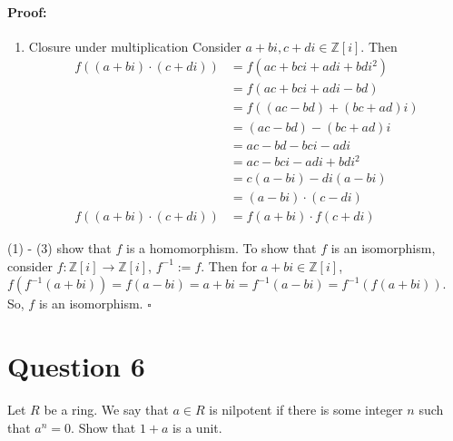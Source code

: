 \documentclass [12pt] {article}
\newcommand{\Z}{\mathbb{Z}}
\newenvironment{proof}{\paragraph{Proof:}}{\hfill$\square$}
\begin{document}
\begin{proof}
\begin{enumerate}
        \item Closure under multiplication Consider $a + bi, c + di \in \Z[i]$. Then
            \begin{align*}
                f((a + bi) \cdot (c + di)) &= f(ac + bci + adi + bdi^2) \\
                                       &= f(ac + bci + adi - bd) \\
                                       &= f((ac - bd) + (bc + ad)i) \\
                                       &= (ac - bd) - (bc + ad)i \\
                                       &= ac - bd - bci - adi \\
                                       &= ac - bci - adi + bdi^2 \\
                                       &= c(a - bi) - di(a - bi) \\
                                       &= (a - bi) \cdot (c - di) \\
                f((a + bi) \cdot (c + di)) &= f(a + bi) \cdot f(c + di)
            \end{align*}
    \end{enumerate}
    (1) - (3) show that $f$ is a homomorphism. To show that $f$ is an isomorphism, consider
    $f : \Z[i] \to \Z[i]$, $f^{-1} := f$. Then for $a + bi \in \Z[i]$, 
    $f(f^{-1}(a + bi)) = f(a - bi) = a + bi = f^{-1}(a - bi) = f^{-1}(f(a + bi))$. So, $f$ is an
    isomorphism.
\end{proof}
\newpage

\section*{Question 6}
Let $R$ be a ring. We say that $a\in R$ is nilpotent if there is some integer $n$ such that $a^n=0$. 
Show that $1+a$ is a unit. 
\end{document}
